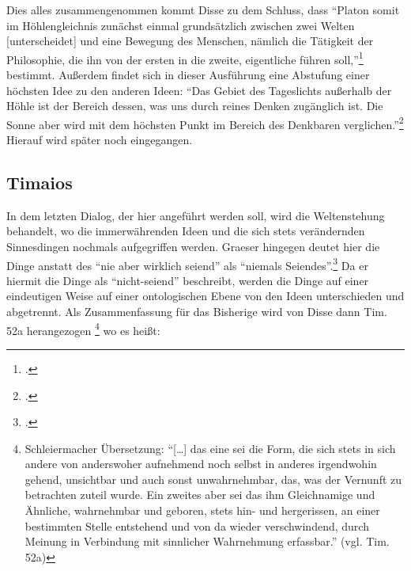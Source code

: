 Dies alles zusammengenommen kommt Disse zu dem Schluss, dass \enquote{Platon somit im Höhlengleichnis zunächst einmal grundsätzlich zwischen zwei Welten [unterscheidet] und eine Bewegung des Menschen, nämlich die Tätigkeit der Philosophie, die ihn von der ersten in die zweite, eigentliche führen soll,}\footcite[vgl.][S. 23f.]{DisseMetaphysik} bestimmt.
Außerdem findet sich in dieser Ausführung eine Abstufung einer höchsten Idee zu den anderen Ideen: 
\enquote{Das Gebiet des Tageslichts außerhalb der Höhle ist der Bereich dessen, was uns durch reines Denken zugänglich ist. Die Sonne aber wird mit dem höchsten Punkt im Bereich des Denkbaren verglichen.}\footcite[][S. 49]{DisseMetaphysik} Hierauf wird später noch eingegangen.

\subsection{Timaios}
In dem letzten Dialog, der hier angeführt werden soll, wird die Weltenstehung behandelt, wo die immerwährenden Ideen und die sich stets verändernden Sinnesdingen nochmals aufgegriffen werden. 
 Graeser hingegen deutet hier die Dinge anstatt des \enquote{nie aber wirklich seiend} als \enquote{niemals Seiendes}.\footcite[vgl.][S. 140]{GraeserPhiloGeschichte} Da er hiermit die Dinge als \enquote{nicht-seiend} beschreibt, werden die Dinge auf einer eindeutigen Weise auf einer ontologischen Ebene von den Ideen unterschieden und abgetrennt.
Als Zusammenfassung für das Bisherige wird von Disse dann Tim. 52a herangezogen
\footnote{Schleiermacher Übersetzung: \enquote{[\dots] das eine sei die Form, die sich stets in sich andere von anderswoher aufnehmend noch selbst in anderes irgendwohin gehend, unsichtbar und auch sonst unwahrnehmbar, das, was der Vernunft zu betrachten zuteil wurde. Ein zweites aber sei das ihm Gleichnamige und Ähnliche, wahrnehmbar und geboren, stets hin- und hergerissen, an einer bestimmten Stelle entstehend und von da wieder verschwindend, durch Meinung in Verbindung mit sinnlicher Wahrnehmung erfassbar.} (vgl. Tim. 52a)} 
wo es heißt:
